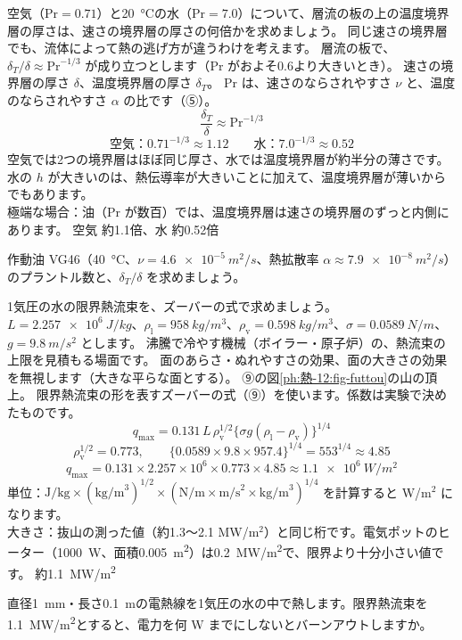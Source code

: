 \label{ph:熱-12:ex6}
\begin{phreidai}[空気と水のプラントル数]
空気（$\mathrm{Pr}=0.71$）と\qty{20}{\celsius}の水（$\mathrm{Pr}=7.0$）について、層流の板の上の温度境界層の厚さは、速さの境界層の厚さの何倍かを求めましょう。
\phbamen
同じ速さの境界層でも、流体によって熱の逃げ方が違うわけを考えます。
\phmushi
層流の板で、$\delta_T/\delta\approx\mathrm{Pr}^{-1/3}$ が成り立つとします（$\mathrm{Pr}$ がおよそ0.6より大きいとき）。
\phzu
速さの境界層の厚さ $\delta$、温度境界層の厚さ $\delta_T$。
\phriyu
Pr は、速さのならされやすさ $\nu$ と、温度のならされやすさ $\alpha$ の比です（⑤）。
\phtateru
\[\frac{\delta_T}{\delta}\approx\mathrm{Pr}^{-1/3}\]
\phtoku
\[\text{空気：}0.71^{-1/3}\approx1.12\qquad\text{水：}7.0^{-1/3}\approx0.52\]
\phtashikame
空気では2つの境界層はほぼ同じ厚さ、水では温度境界層が約半分の薄さです。水の $h$ が大きいのは、熱伝導率が大きいことに加えて、温度境界層が薄いからでもあります。\\
極端な場合：油（Pr が数百）では、温度境界層は速さの境界層のずっと内側にあります。
\kotae 空気 約1.1倍、水 約0.52倍
\end{phreidai}
\begin{jibun}
作動油 VG46（\qty{40}{\celsius}、$\nu=\qty{4.6e-5}{m^2/s}$、熱拡散率 $\alpha\approx\qty{7.9e-8}{m^2/s}$）のプラントル数と、$\delta_T/\delta$ を求めましょう。
\end{jibun}

\label{ph:熱-12:ex7}
\begin{phreidai}[水の限界熱流束]
1気圧の水の限界熱流束を、ズーバーの式で求めましょう。$L=\qty{2.257e6}{J/kg}$、$\rho_{\mathrm l}=\qty{958}{kg/m^3}$、$\rho_{\mathrm v}=\qty{0.598}{kg/m^3}$、$\sigma=\qty{0.0589}{N/m}$、$g=\qty{9.8}{m/s^2}$ とします。
\phbamen
沸騰で冷やす機械（ボイラー・原子炉）の、熱流束の上限を見積もる場面です。
\phmushi
面のあらさ・ぬれやすさの効果、面の大きさの効果を無視します（大きな平らな面とする）。
\phzu
⑨の図\ref{ph:熱-12:fig-futtou}の山の頂上。
\phriyu
限界熱流束の形を表すズーバーの式（⑨）を使います。係数は実験で決めたものです。
\phtateru
\[q_{\max}=0.131\,L\,\rho_{\mathrm v}^{1/2}\bigl\{\sigma g(\rho_{\mathrm l}-\rho_{\mathrm v})\bigr\}^{1/4}\]
\phtoku
\[\rho_{\mathrm v}^{1/2}=0.773,\qquad\{0.0589\times9.8\times957.4\}^{1/4}=553^{1/4}\approx4.85\]
\[q_{\max}=0.131\times2.257\times10^6\times0.773\times4.85\approx\qty{1.1e6}{W/m^2}\]
\phtashikame
単位：$\text{J/kg}\times(\text{kg/m}^3)^{1/2}\times(\text{N/m}\times\text{m/s}^2\times\text{kg/m}^3)^{1/4}$ を計算すると W/m$^2$ になります。\\
大きさ：抜山の測った値（約1.3〜2.1 MW/m$^2$）と同じ桁です。電気ポットのヒーター（\qty{1000}{W}、面積\qty{0.005}{m^2}）は\qty{0.2}{MW/m^2}で、限界より十分小さい値です。
\kotae 約\qty{1.1}{MW/m^2}
\end{phreidai}
\begin{jibun}
直径\qty{1}{mm}・長さ\qty{0.1}{m}の電熱線を1気圧の水の中で熱します。限界熱流束を\qty{1.1}{MW/m^2}とすると、電力を何 W までにしないとバーンアウトしますか。
\end{jibun}

